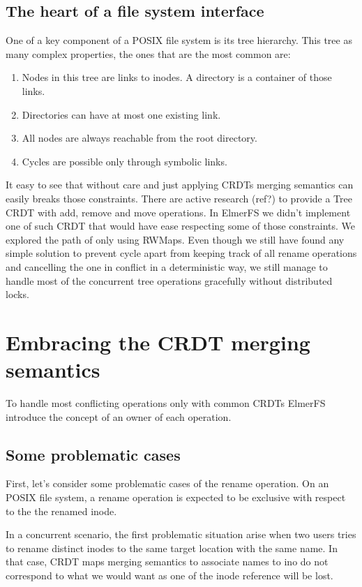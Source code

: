 \documentclass[sigplan, 10pt]{acmart}
\begin{document}
\subsection{The heart of a file system interface}

One of a key component of a POSIX file system is its tree hierarchy.
This tree as many complex properties, the ones that are the most common are:

\begin{enumerate}
    \item Nodes in this tree are links to inodes. A directory is a container
    of those links.
    \item Directories can have at most one existing link.
    \item All nodes are always reachable from the root directory.
    \item Cycles are possible only through symbolic links.
\end{enumerate}

It easy to see that without care and just applying CRDTs merging semantics
can easily breaks those constraints. There are active research (ref?)
to provide a Tree CRDT with add, remove and move operations.
In ElmerFS we didn't implement one of such CRDT that would have ease respecting
some of those constraints. We explored the path of only using RWMaps.
Even though we still have found any simple solution to prevent cycle apart from
keeping track of all rename operations and cancelling the
one in conflict in a deterministic way,
we still manage to handle most of the concurrent tree operations gracefully without distributed locks.

\section{Embracing the CRDT merging semantics}

To handle most conflicting operations only with common
CRDTs ElmerFS introduce the concept of an owner of each operation.

\subsection{Some problematic cases}

First, let's consider some problematic cases of the rename operation. On an POSIX file system, a rename operation is expected to be exclusive with respect to the
the renamed inode.

In a concurrent scenario, the first problematic situation
arise when two users tries to rename distinct inodes to the same target location with the same name. In that case,
CRDT maps merging semantics to associate names to ino do not correspond to what we would want as one of the inode reference will be lost.
\end{document}
